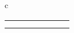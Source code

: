 \begin{longtable}{c}
{\begin{tabular}{cllllcc}
	\multicolumn{1}{l}{}              &                                 &                                                                                                                                                                                                                   &                                                                                                                                                           &                                                                                                                                                                                                                                      & \multicolumn{1}{l}{}                                                                                 & \multicolumn{1}{l}{}                                                                                  \\
	\multicolumn{1}{l}{}              &                                 &                                                                                                                                                                                                                   &                                                                                                                                                           &                                                                                                                                                                                                                                      & \multicolumn{1}{l}{}                                                                                 & \multicolumn{1}{l}{}                                                                                 
\end{tabular}}
\end{longtable}
